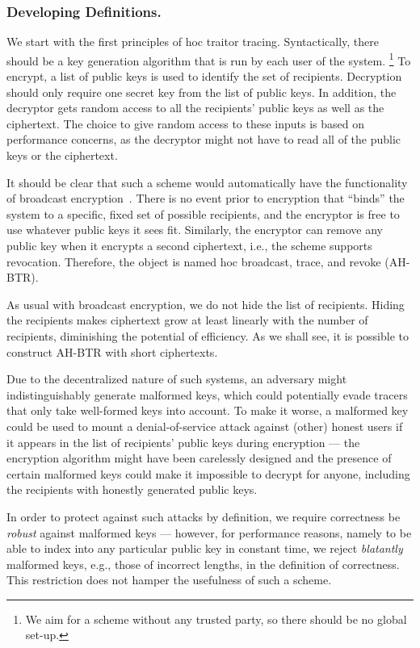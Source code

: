 \subsubsection{Developing Definitions.}
We start with the first principles of \ad hoc traitor tracing.
Syntactically, there should be a key generation algorithm that is run by each user of the system.%
\footnote{We aim for a scheme without any trusted party, so there should be no global set-up.}
To encrypt, a list of public keys is used to identify the set of recipients.
Decryption should only require one secret key from the list of public keys.
In addition, the decryptor gets random access to all the recipients' public keys as well as the ciphertext.
The choice to give random access to these inputs is based on performance concerns, as the decryptor might not have to read all of the public keys or the ciphertext.

It should be clear that such a scheme would automatically have the functionality of broadcast encryption~\cite{C:FiaNao93}.
There is no event prior to encryption that ``binds'' the system to a specific, fixed set of possible recipients, and the encryptor is free to use whatever public keys it sees fit.
Similarly, the encryptor can remove any public key when it encrypts a second ciphertext, i.e., the scheme supports revocation.
Therefore, the object is named \ad hoc broadcast, trace, and revoke (AH-BTR).

As usual with broadcast encryption, we do not hide the list of recipients.
Hiding the recipients makes ciphertext
grow at least linearly with the number of recipients,
diminishing the potential of efficiency.
As we shall see, it is possible to construct AH-BTR with short ciphertexts.

Due to the decentralized nature of such systems,
an adversary might indistinguishably generate malformed keys,
which could potentially evade tracers that only take well-formed keys into account.
To make it worse, a malformed key could be used to mount a denial-of-service attack against (other) honest users if it appears in the list of recipients' public keys during encryption ---
the encryption algorithm might have been carelessly designed and the presence of certain malformed keys could make it impossible to decrypt for anyone, including the recipients with honestly generated public keys.

In order to protect against such attacks by definition,
we require correctness be \emph{robust} against malformed keys ---
however, for performance reasons, namely to be able to index into any particular public key in constant time,
we reject \emph{blatantly} malformed keys, e.g., those of incorrect lengths, in the definition of correctness.
This restriction does not hamper the usefulness of such a scheme.

